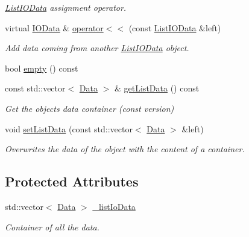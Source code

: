 \begin{DoxyCompactItemize}
\begin{DoxyCompactList}\small\item\em \hyperlink{classfilter_1_1data_1_1_list_i_o_data}{List\+I\+O\+Data} assignment operator. \end{DoxyCompactList}\item 
virtual \hyperlink{classfilter_1_1data_1_1_i_o_data}{I\+O\+Data} \& \hyperlink{classfilter_1_1data_1_1_list_i_o_data_a99b6bad4d2a1899c099e79ef6ec9bfbb}{operator$<$$<$} (const \hyperlink{classfilter_1_1data_1_1_list_i_o_data}{List\+I\+O\+Data} \&left)
\begin{DoxyCompactList}\small\item\em Add data coming from another \hyperlink{classfilter_1_1data_1_1_list_i_o_data}{List\+I\+O\+Data} object. \end{DoxyCompactList}\item 
bool \hyperlink{classfilter_1_1data_1_1_list_i_o_data_ae0c60b47c1df28e014d85c56b2de283e}{empty} () const
\item 
const std\+::vector$<$ \hyperlink{classfilter_1_1data_1_1_data}{Data} $>$ \& \hyperlink{classfilter_1_1data_1_1_list_i_o_data_a9f1538f3292101647fea16c372928dc7}{get\+List\+Data} () const
\begin{DoxyCompactList}\small\item\em Get the object\textquotesingle{}s data container (const version) \end{DoxyCompactList}\item 
void \hyperlink{classfilter_1_1data_1_1_list_i_o_data_a62e1f9fff3f1310e75ed603681397ade}{set\+List\+Data} (const std\+::vector$<$ \hyperlink{classfilter_1_1data_1_1_data}{Data} $>$ \&left)
\begin{DoxyCompactList}\small\item\em Overwrites the data of the object with the content of a container. \end{DoxyCompactList}\end{DoxyCompactItemize}
\subsection*{Protected Attributes}
\begin{DoxyCompactItemize}
\item 
\mbox{\label{classfilter_1_1data_1_1_list_i_o_data_ac1f25bdaeed1a82276f352c760d6da34}} 
std\+::vector$<$ \hyperlink{classfilter_1_1data_1_1_data}{Data} $>$ \hyperlink{classfilter_1_1data_1_1_list_i_o_data_ac1f25bdaeed1a82276f352c760d6da34}{\+\_\+list\+Io\+Data}
\begin{DoxyCompactList}\small\item\em Container of all the data. \end{DoxyCompactList}\end{DoxyCompactItemize}
